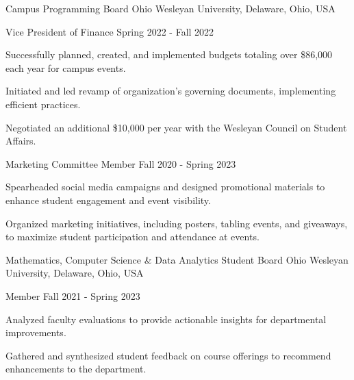 \documentclass[10pt, letterpaper]{article}
\begin{document}
\begin{leadershipentry}
    {Campus Programming Board} %
    {Ohio Wesleyan University, Delaware, Ohio, USA} %
    \begin{positionentry}
        {Vice President of Finance} %
        {Spring 2022 - Fall 2022} %
        \item Successfully planned, created, and implemented budgets totaling over \$86,000 each year for campus events.
        \item Initiated and led revamp of organization's governing documents, implementing efficient practices.
        \item Negotiated an additional \$10,000 per year with the Wesleyan Council on Student Affairs.
    \end{positionentry}
    \begin{positionentry}
        {Marketing Committee Member} %
        {Fall 2020 - Spring 2023} %
        \item Spearheaded social media campaigns and designed promotional materials to enhance student engagement and event visibility.
        \item Organized marketing initiatives, including posters, tabling events, and giveaways, to maximize student participation and attendance at events.
    \end{positionentry}
\end{leadershipentry}

\begin{leadershipentry}
    {Mathematics, Computer Science \& Data Analytics Student Board} %
    {Ohio Wesleyan University, Delaware, Ohio, USA} %
    \begin{positionentry}
        {Member} %
        {Fall 2021 - Spring 2023} %
        \item Analyzed faculty evaluations to provide actionable insights for departmental improvements.
        \item Gathered and synthesized student feedback on course offerings to recommend enhancements to the department.
    \end{positionentry}
\end{leadershipentry}
\end{document}

